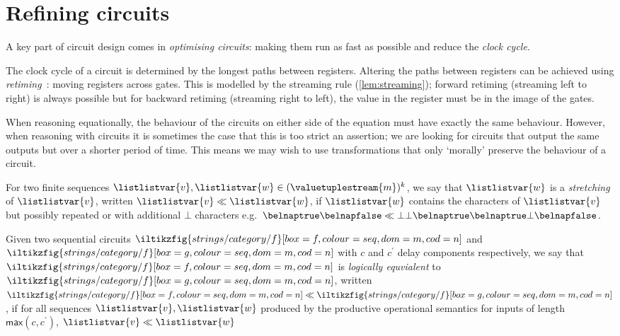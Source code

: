 \section{Refining circuits}

A key part of circuit design comes in \emph{optimising circuits}: making them
run as fast as possible and reduce the \emph{clock cycle}.

\begin{example}[Retiming]
    The clock cycle of a circuit is determined by the longest paths between
    registers. Altering the paths between registers can be achieved using
    \emph{retiming}~\cite{leiserson1991retiming}: moving registers across gates.
    This is modelled by the streaming rule (\cref{lem:streaming});
    forward retiming (streaming left to right) is always possible
    but for backward retiming (streaming right to left), the value
    in the register must be in the image of the gates.
\end{example}

When reasoning equationally, the behaviour of the circuits on either side of the
equation must have exactly the same behaviour.
However, when reasoning with circuits it is sometimes the case that this is too
strict an assertion; we are looking for circuits that output the same outputs
but over a shorter period of time.
This means we may wish to use transformations that only `morally' preserve the
behaviour of a circuit.

\begin{definition}
    For two finite sequences \(
    \listlistvar{v},\listlistvar{w} \in (\valuetuplestream{m})^k
    \), we say that \(\listlistvar{w}\) is a \emph{stretching} of
    \(\listlistvar{v}\), written \(\listlistvar{v} \ll \listlistvar{w}\), if
    \(\listlistvar{w}\) contains the characters of \(\listlistvar{v}\) but
    possibly repeated or with additional \(\bot\) characters e.g.\ \(
    \belnaptrue\belnapfalse
    \ll
    \bot\bot\belnaptrue\belnaptrue\bot\belnapfalse
    \).
\end{definition}

\begin{definition}
    Given two sequential circuits \(
    \iltikzfig{strings/category/f}[box=f,colour=seq,dom=m,cod=n]
    \) and \(
    \iltikzfig{strings/category/f}[box=g,colour=seq,dom=m,cod=n]
    \) with \(c\) and \(c^\prime\) delay components respectively, we say that \(
    \iltikzfig{strings/category/f}[box=f,colour=seq,dom=m,cod=n]
    \) is \emph{logically equvialent} to \(
    \iltikzfig{strings/category/f}[box=g,colour=seq,dom=m,cod=n]
    \), written \(
    \iltikzfig{strings/category/f}[box=f,colour=seq,dom=m,cod=n]
    \ll
    \iltikzfig{strings/category/f}[box=g,colour=seq,dom=m,cod=n]
    \), if for all sequences \(\listlistvar{v},\listlistvar{w}\) produced by the
    productive operational semantics for inputs of length
    \(\mathsf{max}(c,c^\prime)\),  \(\listlistvar{v} \ll \listlistvar{w}\)
\end{definition}

